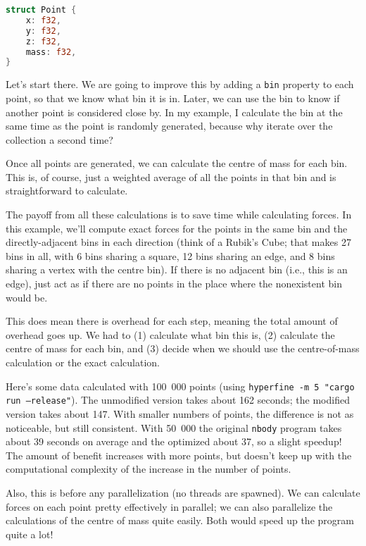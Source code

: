 \begin{lstlisting}[language=Rust]
struct Point {
    x: f32,
    y: f32,
    z: f32,
    mass: f32,
}
\end{lstlisting}

Let's start there. We are going to improve this by adding a \texttt{bin} property to each point, so that we know what bin it is in. Later, we can use the bin to know if another point is considered close by. In my example, I calculate the bin at the same time as the point is randomly generated, because why iterate over the collection a second time?

Once all points are generated, we can calculate the centre of mass for each bin. This is, of course, just a weighted average of all the points in that bin and is straightforward to calculate.

The payoff from all these calculations is to save time while
calculating forces. In this example, we'll compute exact
forces for the points in the same bin and the directly-adjacent bins
in each direction (think of a Rubik's Cube; that makes 27 bins in all,
with 6 bins sharing a square, 12 bins sharing an edge, and 8 bins
sharing a vertex with the centre bin). If there is no adjacent bin 
(i.e., this is an edge), just act as if there are no points 
in the place where the nonexistent bin would be. 

This does mean there is overhead for each step, meaning the total amount of overhead goes up. We had to (1) calculate what bin this is, (2) calculate the centre of mass for each bin, and (3) decide when we should use the centre-of-mass calculation or the exact calculation.

Here's some data calculated with 100~000 points (using \texttt{hyperfine -m 5 "cargo run --release"}). The unmodified version takes about 162 seconds; the modified version takes about 147. With smaller numbers of points, the difference is not as noticeable, but still consistent. With 50~000 the original \texttt{nbody} program takes about 39 seconds on average and the optimized about 37, so a slight speedup! The amount of benefit increases with more points, but doesn't keep up with the computational complexity of the increase in the number of points.

Also, this is before any parallelization (no threads are spawned). We can calculate forces on each point pretty effectively in parallel; we can also parallelize the calculations of the centre of mass quite easily. Both would speed up the program quite a lot! 

